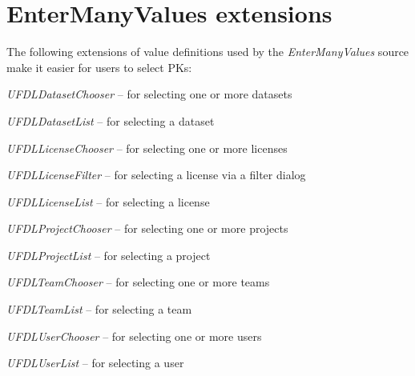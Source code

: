\documentclass[a4paper]{book}
\begin{document}
\section{EnterManyValues extensions}
The following extensions of value definitions used by the \textit{EnterManyValues}
source make it easier for users to select PKs:
\begin{tight_itemize}
  \item \textit{UFDLDatasetChooser} -- for selecting one or more datasets
  \item \textit{UFDLDatasetList} -- for selecting a dataset
  \item \textit{UFDLLicenseChooser} -- for selecting one or more licenses
  \item \textit{UFDLLicenseFilter} -- for selecting a license via a filter dialog
  \item \textit{UFDLLicenseList} -- for selecting a license
  \item \textit{UFDLProjectChooser} -- for selecting one or more projects
  \item \textit{UFDLProjectList} -- for selecting a project
  \item \textit{UFDLTeamChooser} -- for selecting one or more teams
  \item \textit{UFDLTeamList} -- for selecting a team
  \item \textit{UFDLUserChooser} -- for selecting one or more users
  \item \textit{UFDLUserList} -- for selecting a user
\end{tight_itemize}
\end{document}
